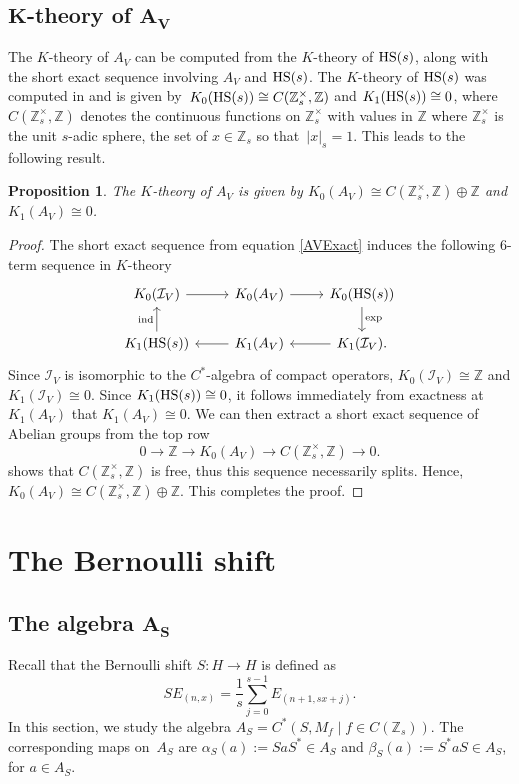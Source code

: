 \documentclass[pdftex]{sigma}
\newcommand{\Z}{{\mathbb Z}}
\numberwithin{equation}{section}
\newtheorem{Proposition}[Theorem]{Proposition}
 { \theoremstyle{definition}
\newtheorem{Definition}[Theorem]{Definition}
\newtheorem{Note}[Theorem]{Note}
\newtheorem{Example}[Theorem]{Example}
\newtheorem{Remark}[Theorem]{Remark} }
\begin{document}
\subsection[K-theory of A\_V]{$\boldsymbol{K}$-theory of $\boldsymbol{A_V}$}
The $K$-theory of $A_V$ can be computed from the $K$-theory of ${\rm HS}(s)$, along with the short exact sequence involving $A_V$ and ${\rm HS}(s)$. The $K$-theory of ${\rm HS}(s)$ was computed in \cite{HKMP2} and is given by~${
K_0({\rm HS}(s)) \cong C(\Z^\times_s, \Z)}$ and $ K_1({\rm HS}(s)) \cong 0$,
where $C(\Z_s^\times, \Z)$ denotes the continuous functions on $\Z_s^\times$ with values in $\Z$ where $\Z_s^\times$ is the unit $s$-adic sphere, the set of $x\in \Z_s$ so that~${|x|_s = 1}$. This leads to the following result.
\begin{Proposition}
The $K$-theory of $A_V$ is given by
$
K_0(A_V) \cong C(\Z^\times_s, \Z) \oplus \Z $ and $ K_1(A_V) \cong 0$.
\end{Proposition}
\begin{proof}
The short exact sequence from equation \eqref{AVExact}
induces the following $6$-term sequence in $K$-theory
\begin{equation*}
\begin{tikzcd}
 K_0(\mathcal{I}_V) \arrow{r} & K_0(A_V) \arrow{r} & K_0({\rm HS}(s)) \arrow{d}{\textup{exp}} \\
 K_1({\rm HS}(s)) \arrow{u}{\textup{ind}} & K_1(A_V) \arrow{l} & K_1(\mathcal{I}_V) \arrow{l}.
\end{tikzcd}
\end{equation*}
Since $\mathcal{I}_V$ is isomorphic to the $C^*$-algebra of compact operators, $K_0(\mathcal{I}_V) \cong \Z$ and $K_1(\mathcal{I}_V) \cong 0$. Since $K_1({\rm HS}(s)) \cong 0$, it follows immediately from exactness at $K_1(A_V)$ that
$K_1(A_V) \cong 0$.
We can then extract a short exact sequence of Abelian groups from the top row
\begin{equation*}
0 \to \Z \to K_0(A_V) \to C(\Z_s^\times, \Z) \to 0.
\end{equation*}
\cite[Exercise 7.7.5]{HR} shows that $C(\Z_s^\times, \Z)$ is free, thus this sequence necessarily splits. Hence,
$
K_0(A_V) \cong C(\Z_s^\times , \Z) \oplus \Z$.
This completes the proof.
\end{proof}

\section{The Bernoulli shift}
\subsection[The algebra A\_S]{The algebra $\boldsymbol{A_S}$}
Recall that the Bernoulli shift $S\colon H\to H$ is defined as
\begin{equation*}
SE_{(n,x)}=\frac{1}{s}\sum_{j=0}^{s-1}E_{(n+1, sx+j)} .
\end{equation*}
In this section, we study the algebra
$
A_S=C^*(S,M_f\mid f\in C(\Z_s))$.
The corresponding maps on~$A_S$ are
$
\alpha_S(a):=S aS^* \in A_S
$ and $ \beta_S(a):=S^* a S \in A_S$,
for $a\in A_S$.
\end{document}

